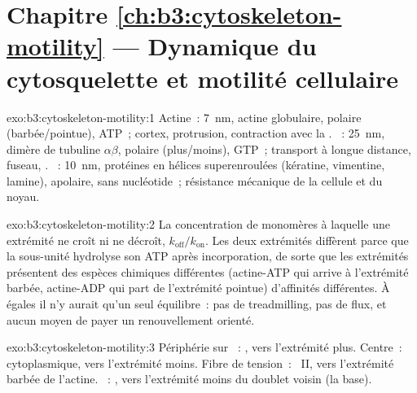 \section*{Chapitre \ref{ch:b3:cytoskeleton-motility} --- Dynamique du cytosquelette et motilité cellulaire}

\begin{solution}{exo:b3:cytoskeleton-motility:1}
Actine~: \qty{7}{nm}, actine globulaire, polaire (barbée/pointue),
ATP~; cortex, protrusion, contraction avec la . ~:
\qty{25}{nm}, dimère de tubuline $\alpha\beta$, polaire (plus/moins),
GTP~; transport à longue distance, fuseau, . ~: \qty{10}{nm}, protéines en hélices superenroulées
(kératine, vimentine, lamine), apolaire, sans nucléotide~; résistance
mécanique de la cellule et du noyau.
\end{solution}

\begin{solution}{exo:b3:cytoskeleton-motility:2}
La concentration de monomères à laquelle une extrémité ne croît ni ne
décroît, $k_{\text{off}}/k_{\text{on}}$. Les deux extrémités diffèrent
parce que la sous-unité hydrolyse son ATP après incorporation, de sorte
que les extrémités présentent des espèces chimiques différentes
(actine-ATP qui arrive à l'extrémité barbée, actine-ADP qui part de
l'extrémité pointue) d'affinités différentes. À  égales il n'y aurait qu'un seul équilibre~: pas de
treadmilling, pas de flux, et aucun moyen de payer un renouvellement
orienté.
\end{solution}

\begin{solution}{exo:b3:cytoskeleton-motility:3}
Périphérie sur ~: , vers l'extrémité plus. Centre~:
 cytoplasmique, vers l'extrémité moins. Fibre de tension~:
~II, vers l'extrémité barbée de l'actine. ~: , vers l'extrémité moins du doublet voisin (la base).
\end{solution}

